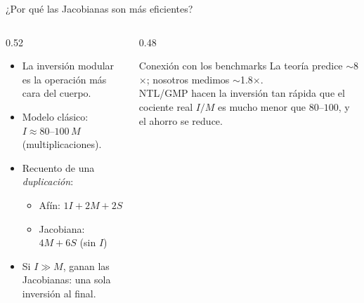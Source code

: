 \documentclass[aspectratio=169,11pt]{beamer}
\begin{document}
\begin{frame}{¿Por qué las Jacobianas son más eficientes?}
  \small
  \begin{columns}[c]
    \begin{column}{0.52\textwidth}
      \begin{itemize}\small
        \item La \alert{inversión modular} es la operación más cara del cuerpo.
        \item Modelo clásico: $I \approx 80\text{--}100\,M$ (multiplicaciones).
        \item Recuento de una \emph{duplicación}:
          \begin{itemize}\footnotesize
            \item Afín: $1I + 2M + 2S$
            \item Jacobiana: $4M + 6S$\; (\alert{sin $I$})
          \end{itemize}
        \item Si $I\gg M$, ganan las Jacobianas: \alert{una sola inversión al final}.
      \end{itemize}
    \end{column}
    \begin{column}{0.48\textwidth}
      \begin{alertblock}{Conexión con los benchmarks}
        La teoría predice $\sim$8$\times$; nosotros medimos $\sim$1.8$\times$.\\[0.6ex]
        NTL/GMP hacen la inversión tan rápida que el cociente real $I/M$ es mucho menor que
        $80$--$100$, y el ahorro se reduce.
      \end{alertblock}
    \end{column}
  \end{columns}
\end{frame}
\end{document}
